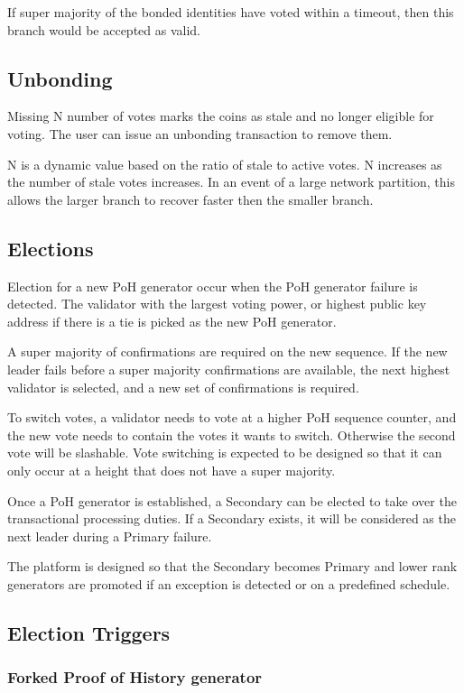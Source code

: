 \documentclass[12pt]{ltjsarticle}
\begin{document}
If super majority of the bonded identities have voted within a timeout, then this branch would be accepted as valid.

\subsection{Unbonding}

Missing N number of votes marks the coins as stale and no longer eligible for voting. The user can issue an unbonding transaction to remove them.

N is a dynamic value based on the ratio of stale to active votes. N increases as the number of stale votes increases. In an event of a large network partition, this allows the larger branch to recover faster then the smaller branch.

\subsection{Elections}\label{subsec:elections}
Election for a new PoH generator occur when the PoH generator failure is detected. The validator with the largest voting power, or highest public key address if there is a tie is picked as the new PoH generator.

A super majority of confirmations are required on the new sequence. If the new leader fails before a super majority confirmations are available, the next highest validator is selected, and a new set of confirmations is required.

To switch votes, a validator needs to vote at a higher PoH sequence counter, and the new vote needs to contain the votes it wants to switch. Otherwise the second vote will be slashable. Vote switching is expected to be designed so that it can only occur at a height that does not have a super majority.

Once a PoH generator is established, a Secondary can be elected to take over the transactional processing duties. If a Secondary exists, it will be considered as the next leader during a Primary failure.

The platform is designed so that the Secondary becomes Primary and lower rank generators are promoted if an exception is detected or on a predefined schedule.
\subsection{Election Triggers}
\subsubsection{Forked Proof of History generator}
\end{document}
